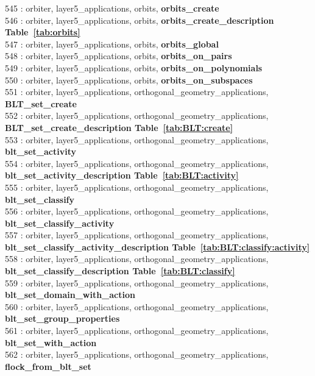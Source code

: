 545 : orbiter, layer5\_applications, orbits, {\bf orbits\_create}\\
546 : orbiter, layer5\_applications, orbits, {\bf orbits\_create\_description Table~\ref{tab:orbits}}\\
547 : orbiter, layer5\_applications, orbits, {\bf orbits\_global}\\
548 : orbiter, layer5\_applications, orbits, {\bf orbits\_on\_pairs}\\
549 : orbiter, layer5\_applications, orbits, {\bf orbits\_on\_polynomials}\\
550 : orbiter, layer5\_applications, orbits, {\bf orbits\_on\_subspaces}\\
551 : orbiter, layer5\_applications, orthogonal\_geometry\_applications, {\bf BLT\_set\_create}\\
552 : orbiter, layer5\_applications, orthogonal\_geometry\_applications, {\bf BLT\_set\_create\_description Table~\ref{tab:BLT:create}}\\
553 : orbiter, layer5\_applications, orthogonal\_geometry\_applications, {\bf blt\_set\_activity}\\
554 : orbiter, layer5\_applications, orthogonal\_geometry\_applications, {\bf blt\_set\_activity\_description Table~\ref{tab:BLT:activity}}\\
555 : orbiter, layer5\_applications, orthogonal\_geometry\_applications, {\bf blt\_set\_classify}\\
556 : orbiter, layer5\_applications, orthogonal\_geometry\_applications, {\bf blt\_set\_classify\_activity}\\
557 : orbiter, layer5\_applications, orthogonal\_geometry\_applications, {\bf blt\_set\_classify\_activity\_description Table~\ref{tab:BLT:classify:activity}}\\
558 : orbiter, layer5\_applications, orthogonal\_geometry\_applications, {\bf blt\_set\_classify\_description Table~\ref{tab:BLT:classify}}\\
559 : orbiter, layer5\_applications, orthogonal\_geometry\_applications, {\bf blt\_set\_domain\_with\_action}\\
560 : orbiter, layer5\_applications, orthogonal\_geometry\_applications, {\bf blt\_set\_group\_properties}\\
561 : orbiter, layer5\_applications, orthogonal\_geometry\_applications, {\bf blt\_set\_with\_action}\\
562 : orbiter, layer5\_applications, orthogonal\_geometry\_applications, {\bf flock\_from\_blt\_set}\\
